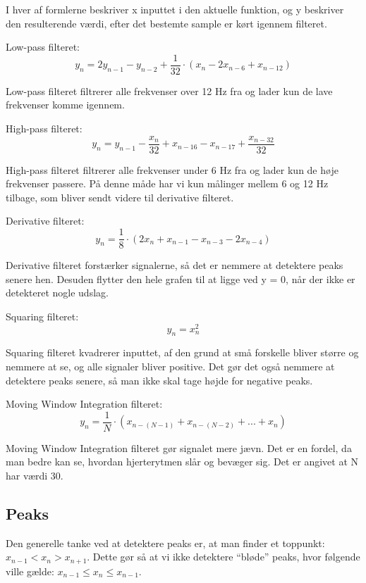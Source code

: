 \documentclass{article}
\begin{document}
I hver af formlerne beskriver x inputtet i den aktuelle funktion, og y beskriver den resulterende værdi, efter det bestemte sample er kørt igennem filteret.

Low-pass filteret:
$$y_n=2y_{n-1}-y_{n-2}+\frac{1}{32}\cdot(x_n-2x_{n-6}+x_{n-12})$$
 
Low-pass filteret filtrerer alle frekvenser over 12 Hz fra og lader kun de lave frekvenser komme igennem.

High-pass filteret:
$$y_n=y_{n-1}-\frac{x_n}{32}+x_{n-16}-x_{n-17}+\frac{x_{n-32}}{32}$$

High-pass filteret filtrerer alle frekvenser under 6 Hz fra og lader kun de høje frekvenser passere. På denne måde har vi kun målinger mellem 6 og 12 Hz tilbage, som bliver sendt videre til derivative filteret.

Derivative filteret:
$$y_n=\frac{1}{8}\cdot(2x_n+x_{n-1}-x_{n-3}-2x_{n-4})$$

Derivative filteret forstærker signalerne, så det er nemmere at detektere peaks senere hen. Desuden flytter den hele grafen til at ligge ved y = 0, når der ikke er detekteret nogle udslag.

Squaring filteret:
$$y_n=x_n^2$$

Squaring filteret kvadrerer inputtet, af den grund at små forskelle bliver større og nemmere at se, og alle signaler bliver positive. Det gør det også nemmere at detektere peaks senere, så man ikke skal tage højde for negative peaks.

Moving Window Integration filteret:
$$y_n=\frac{1}{N}\cdot(x_{n-(N-1)}+x_{n-(N-2)}+...+x_n)$$

Moving Window Integration filteret gør signalet mere jævn. Det er en fordel, da man bedre kan se, hvordan hjerterytmen slår og bevæger sig. Det er angivet at N har værdi 30.

\subsection{Peaks}
Den generelle tanke ved at detektere peaks er, at man finder et toppunkt: $x_{n-1} < x_n > x_{n+1}$. Dette gør så at vi ikke detektere “bløde” peaks, hvor følgende ville gælde: $x_{n-1} \leq x_n \leq x_{n-1}$.
\end{document}
